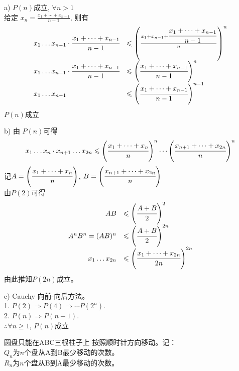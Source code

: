 \begin{answer}
	a) $ P(n) $成立, $ \forall n>1 $\\
	给定 $ x_n = \frac{x_{1}+\cdots+x_{n-1}}{n-1} $, 则有
	\begin{equation*}
		\begin{array}{ll}
			x_1 \dots x_{n-1} \cdot \cfrac{x_{1}+\dots+x_{n-1}}{n-1} 
			&\leqslant \left( \frac{	x_1 + x_{n-1} + \cfrac{x_{1}+\dots+x_{n-1}}{n-1} }{n} \right) ^n \\
			x_1 \dots x_{n-1} \cdot \cfrac{x_{1}+\dots+x_{n-1}}{n-1}
			&\leqslant \left(  \cfrac{x_{1}+\dots+x_{n-1}}{n-1} \right) ^n \\
			x_1 \dots x_{n-1}
			&\leqslant \left(  \cfrac{x_{1}+\dots+x_{n-1}}{n-1} \right) ^{n-1}\\
		\end{array}
	\end{equation*}
	$ P(n) $成立
	
	b) 由 $ P(n) $可得
	\begin{equation*}
		x_{1} \dots x_{n} \cdot x_{n+1} \dots x_{2n} \leqslant \left(\cfrac{x_{1} + \dots + x_{n}}{n}\right)^n \cdots \left(\cfrac{x_{n+1} + \dots + x_{2n}}{n}\right)^n
	\end{equation*}
	记$ A = \left(\cfrac{x_{1} + \dots + x_{n}}{n}\right) $,  $ B = \left(\cfrac{x_{n+1} + \dots + x_{2n}}{n}\right) $\\
	由$ P(2) $可得
	\begin{equation*}
		\begin{array}{rl}
			AB &\leqslant \left(\cfrac{A+B}{2}\right)^{2}  \\
			A^{n} B^{n} = (AB)^{n} &\leqslant \left(\cfrac{A+B}{2}\right)^{2n} \\
			x_{1}\dots x_{2n} &\leqslant \left(\cfrac{x_{1}+\dots +x_{2n}}{2n}\right)^{2n} \\
		\end{array}
	\end{equation*}
	由此推知$ P(2n) $成立。
	
	c) Cauchy 向前-向后方法。\\
	1. $ P(2)\Rightarrow P(4)\Rightarrow\cdots P(2^n) $. \\
	2. $ P(n)\Rightarrow P(n-1) $.\\
	$ \therefore \forall n\geqslant 1 $, $ P(n) $成立
\end{answer}

\begin{exercise}
	圆盘只能在ABC三根柱子上 按照顺时针方向移动。记：\\
	$ Q_{n} $为$ n $个盘从A到B最少移动的次数。\\
	$ R_{n} $为$ n $个盘从B到A最少移动的次数。	
\end{exercise}

